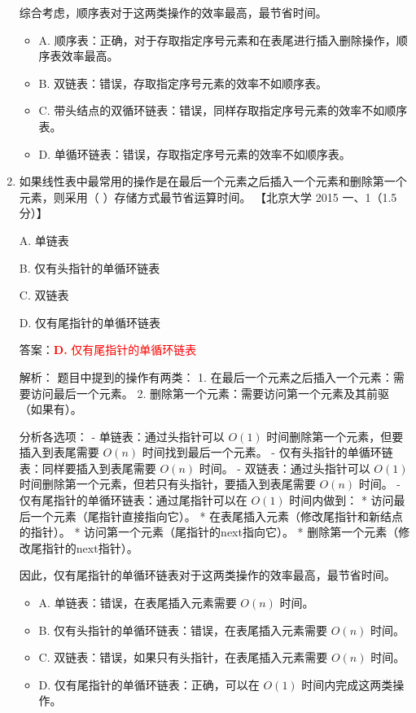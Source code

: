 \documentclass[lang=cn,newtx,10pt,scheme=chinese]{../../../elegantbook}
\begin{document}
\begin{enumerate}
        综合考虑，顺序表对于这两类操作的效率最高，最节省时间。

        \begin{itemize}
            \item A. 顺序表：正确，对于存取指定序号元素和在表尾进行插入删除操作，顺序表效率最高。
            \item B. 双链表：错误，存取指定序号元素的效率不如顺序表。
            \item C. 带头结点的双循环链表：错误，同样存取指定序号元素的效率不如顺序表。
            \item D. 单循环链表：错误，存取指定序号元素的效率不如顺序表。
        \end{itemize}
    
        \item 如果线性表中最常用的操作是在最后一个元素之后插入一个元素和删除第一个元素，则采用（ ）存储方式最节省运算时间。  
        【北京大学 2015 一、1（1.5 分）】  
    
        A. 单链表  
    
        B. 仅有头指针的单循环链表  
    
        C. 双链表  
    
        D. 仅有尾指针的单循环链表  

        答案：\textcolor{red}{\textbf{D.} 仅有尾指针的单循环链表}

        解析：
        题目中提到的操作有两类：
        1. 在最后一个元素之后插入一个元素：需要访问最后一个元素。
        2. 删除第一个元素：需要访问第一个元素及其前驱（如果有）。

        分析各选项：
        - 单链表：通过头指针可以 $O(1)$ 时间删除第一个元素，但要插入到表尾需要 $O(n)$ 时间找到最后一个元素。
        - 仅有头指针的单循环链表：同样要插入到表尾需要 $O(n)$ 时间。
        - 双链表：通过头指针可以 $O(1)$ 时间删除第一个元素，但若只有头指针，要插入到表尾需要 $O(n)$ 时间。
        - 仅有尾指针的单循环链表：通过尾指针可以在 $O(1)$ 时间内做到：
          * 访问最后一个元素（尾指针直接指向它）。
          * 在表尾插入元素（修改尾指针和新结点的指针）。
          * 访问第一个元素（尾指针的next指向它）。
          * 删除第一个元素（修改尾指针的next指针）。

        因此，仅有尾指针的单循环链表对于这两类操作的效率最高，最节省时间。

        \begin{itemize}
            \item A. 单链表：错误，在表尾插入元素需要 $O(n)$ 时间。
            \item B. 仅有头指针的单循环链表：错误，在表尾插入元素需要 $O(n)$ 时间。
            \item C. 双链表：错误，如果只有头指针，在表尾插入元素需要 $O(n)$ 时间。
            \item D. 仅有尾指针的单循环链表：正确，可以在 $O(1)$ 时间内完成这两类操作。
        \end{itemize}
    

\end{enumerate}
\end{document}
